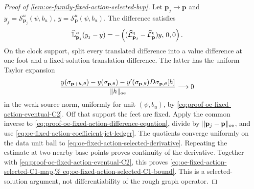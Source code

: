 \begin{proof}[Proof of
\cref{lem:oe-family-fixed-action-selected-bvp}]
Let \(\mathbf p_j\to\mathbf p\) and
\(y_j=\mathscr S_{\mathbf p_j}^{u}(\psi,b_u)\),
\(y=\mathscr S_{\mathbf p}^{u}(\psi,b_u)\).  The difference satisfies
\begin{equation}
 \widehat{\mathbb L}_{\mathbf p_j}^{u}(y_j-y)
 =-\left(
   (\widehat{\mathcal L}_{\mathbf p_j}^{\rm q}
       -\widehat{\mathcal L}_{\mathbf p}^{\rm q})y,\,
       0,0\right).                              \label{eq:proof-oe-fixed-action-difference-equation}
\end{equation}
On the clock support, split every translated difference into a value
difference at one foot and a fixed-solution translation difference.
The latter has the uniform Taylor expansion
\begin{equation}
 \frac{y(\sigma_{\mathbf p+h,\theta})
          -y(\sigma_{\mathbf p,\theta})
          -y'(\sigma_{\mathbf p,\theta})
             D\sigma_{\mathbf p,\theta}[h]}
        {\|h\|_{\rm oe}}
 \longrightarrow0                              \label{eq:proof-oe-fixed-action-foot-remainder}
\end{equation}
in the weak source norm, uniformly for unit
\((\psi,b_u)\), by
\cref{eq:proof-oe-fixed-action-eventual-C2}.  Off that support the feet
are fixed.  Apply the common inverse to
\cref{eq:proof-oe-fixed-action-difference-equation}, divide by
\(\|\mathbf p_j-\mathbf p\|_{\rm oe}\), and use
\cref{eq:oe-fixed-action-coefficient-jet-ledger}.  The quotients converge
uniformly on the data unit ball to
\cref{eq:oe-fixed-action-selected-derivative}.  Repeating the estimate
at two nearby base points proves continuity of the derivative.
Together with
\cref{eq:proof-oe-fixed-action-eventual-C2}, this proves
\cref{eq:oe-fixed-action-selected-C1-map,%
eq:oe-fixed-action-selected-C1-bound}.  This is a selected-solution
argument, not differentiability of the rough graph operator.


\end{proof}
